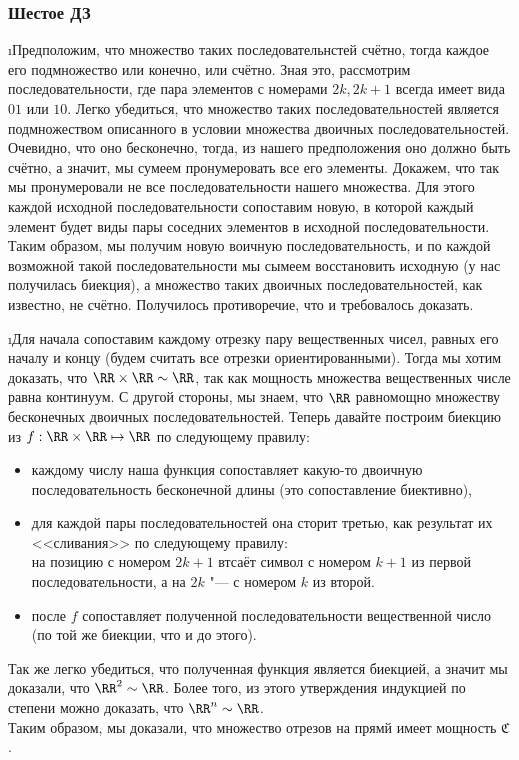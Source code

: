 \subsubsection{Шестое ДЗ}


\i Предположим, что множество таких последовательнстей счётно, тогда каждое его подмножество или конечно, или счётно. Зная это, рассмотрим последовательности, где пара элементов с номерами $2k, 2k+1$ всегда имеет вида $01$ или $10$. Легко убедиться, что множество таких последовательностей является подмножеством описанного в условии множества двоичных последовательностей. Очевидно, что оно бесконечно, тогда, из нашего предположения оно должно быть счётно, а значит, мы сумеем пронумеровать все его элементы. Докажем, что так мы пронумеровали не все последовательности нашего множества. Для этого каждой исходной последовательности сопоставим новую, в которой каждый элемент будет виды пары соседних элементов в исходной последовательности. Таким образом, мы получим новую воичную последовательность, и по каждой возможной такой последовательности мы сымеем восстановить исходную (у нас получилась биекция), а множество таких двоичных последовательностей, как известно, не счётно. Получилось противоречие, что и требовалось доказать.

\i Для начала сопоставим каждому отрезку пару вещественных чисел, равных его началу и концу (будем считать все отрезки ориентированными). Тогда мы хотим доказать, что $\RR \times \RR \sim \RR$, так как мощность множества вещественных числе равна континуум. С другой стороны, мы знаем, что $\RR$ равномощно множеству бесконечных двоичных последовательностей. Теперь давайте построим биекцию из $f: \RR \times \RR \mapsto \RR$ по следующему правилу:
\begin{itemize}
    \item каждому числу наша функция сопоставляет какую-то двоичную последовательность бесконечной длины (это сопоставление биективно),
    \item для каждой пары последовательностей она сторит третью, как результат их <<сливания>> по следующему правилу:\\
    на позицию с номером $2k+1$ втсаёт символ с номером $k+1$ из первой последовательности, а на $2k$ "--- с номером $k$ из второй.
    \item после $f$ сопоставляет полученной последовательности вещественной число (по той же биекции, что и до этого).
\end{itemize}
Так же легко убедиться, что полученная функция является биекцией, а значит мы доказали, что $\RR^2 \sim \RR$. Более того, из этого утверждения индукцией по степени можно доказать, что $\RR^n \sim \RR$.\\
Таким образом, мы доказали, что множество отрезов на прямй имеет мощность $\mathfrak{C}$.

